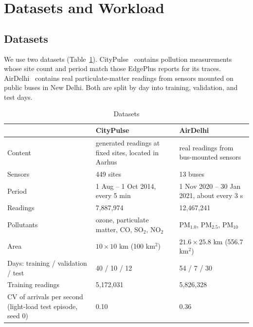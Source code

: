 \documentclass[11pt,journal,onecolumn]{IEEEtran}
\begin{document}
\section{Datasets and Workload}
\label{sec:data}

\subsection{Datasets}
We use two datasets (Table~\ref{tab:datasets}). CityPulse~\cite{citypulse} contains pollution measurements whose site count and period match those EdgePlus reports for its traces. AirDelhi~\cite{airdelhi} contains real particulate-matter readings from sensors mounted on public buses in New Delhi. Both are split by day into training, validation, and test days.

\begin{table}[!t]
\centering
\caption{Datasets}
\label{tab:datasets}
\footnotesize
\begin{tabular}{p{}p{}p{}}
\toprule
 & CityPulse & AirDelhi\\
\midrule
Content & generated readings at fixed sites, located in Aarhus & real readings from bus-mounted sensors\\
Sensors & 449 sites & 13 buses\\
Period & 1 Aug -- 1 Oct 2014, every 5 min & 1 Nov 2020 -- 30 Jan 2021, about every 3 s\\
Readings & 7,887,974 & 12,467,241\\
Pollutants & ozone, particulate matter, CO, SO$_2$, NO$_2$ & PM$_{1.0}$, PM$_{2.5}$, PM$_{10}$\\
Area & $10\times10$ km (100 km$^2$) & $21.6\times25.8$ km (556.7 km$^2$)\\
Days: training / validation / test & 40 / 10 / 12 & 54 / 7 / 30\\
Training readings & 5,172,031 & 5,826,328\\
CV of arrivals per second (light-load test episode, seed 0) & 0.10 & 0.36\\
\bottomrule
\end{tabular}
\end{table}
\end{document}
